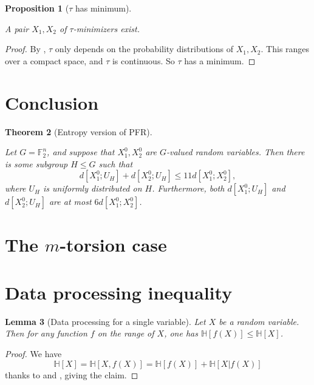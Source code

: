 \documentclass[10pt,a4paper]{article}
\newtheorem{theorem}{Theorem}
\newtheorem{lemma}[theorem]{Lemma}
\newtheorem{proposition}[theorem]{Proposition}
\newcommand{\lean}[1]{}
\newcommand{\uses}[1]{}
\newcommand{\leanok}{}
\newcommand{\chapter}[1]{\section{#1}}
\newcommand{\F}{\mathbb{F}}
\newcommand{\bbH}{\mathbb{H}}
\begin{document}
\begin{proposition}[$\tau$ has minimum]\label{tau-min}\uses{tau-min-def}
  \lean{tau_minimizer_exists}\leanok
A pair $X_1, X_2$ of $\tau$-minimizers exist.
\end{proposition}

\begin{proof}\uses{tau-copy}\leanok By , $\tau$ only depends on the probability distributions of $X_1, X_2$. This ranges over a compact space, and $\tau$ is continuous.  So $\tau$ has a minimum.
\end{proof}



\section{Conclusion}

\begin{theorem}[Entropy version of PFR]\label{entropy-pfr}
  \lean{entropic_PFR_conjecture}\leanok
  Let $G = \F_2^n$, and suppose that $X^0_1, X^0_2$ are $G$-valued random variables.
  Then there is some subgroup $H \leq G$ such that
  \[
    d[X^0_1;U_H] + d[X^0_2;U_H] \le 11 d[X^0_1;X^0_2],
  \]
  where $U_H$ is uniformly distributed on $H$.
  Furthermore, both $d[X^0_1;U_H]$ and $d[X^0_2;U_H]$ are at most $6 d[X^0_1;X^0_2]$.
\end{theorem}

\chapter{The \texorpdfstring{$m$}{m}-torsion case}

\section{Data processing inequality}

\begin{lemma}[Data processing for a single variable]\label{data-process-single}\lean{ProbabilityTheory.entropy_comp_le}\leanok  Let $X$ be a random variable.  Then for any function $f$ on the range of $X$, one has $\bbH[f(X)] \leq \bbH[X]$.
\end{lemma}

\begin{proof}\uses{relabeled-entropy, chain-rule}\leanok
We have
$$ \bbH[X] = \bbH[X,f(X)] = \bbH[f(X)] + \bbH[X|f(X)]$$
thanks to  and , giving the claim.
\end{proof}
\end{document}
